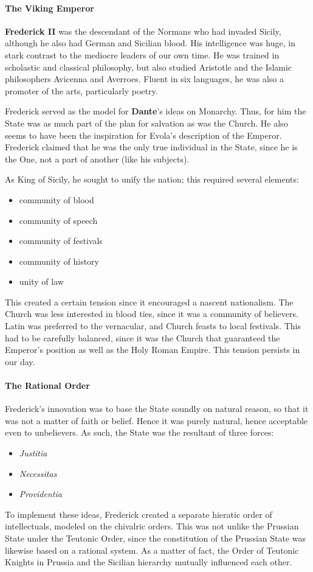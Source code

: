 \paragraph{The Viking Emperor}
\textbf{Frederick II} was the descendant of the Normans who had invaded Sicily, although he also had German and Sicilian blood. His intelligence was huge, in stark contrast to the mediocre leaders of our own time. He was trained in scholastic and classical philosophy, but also studied Aristotle and the Islamic philosophers Avicenna and Averroes. Fluent in six languages, he was also a promoter of the arts, particularly poetry.

Frederick served as the model for \textbf{Dante}'s ideas on Monarchy. Thus, for him the State was as much part of the plan for salvation as was the Church. He also seems to have been the inspiration for Evola's description of the Emperor. Frederick claimed that he was the only true individual in the State, since he is the One, not a part of another (like his subjects).

As King of Sicily, he sought to unify the nation; this required several elements:

\begin{itemize}
\item community of blood 
\item community of speech 
\item community of festivals 
\item community of history 
\item unity of law 
\end{itemize}
This created a certain tension since it encouraged a nascent nationalism. The Church was less interested in blood ties, since it was a community of believers. Latin was preferred to the vernacular, and Church feasts to local festivals. This had to be carefully balanced, since it was the Church that guaranteed the Emperor's position as well as the Holy Roman Empire. This tension persists in our day.

\paragraph{The Rational Order}
Frederick's innovation was to base the State soundly on natural reason, so that it was not a matter of faith or belief. Hence it was purely natural, hence acceptable even to unbelievers. As such, the State was the resultant of three forces:

\begin{itemize}
\item \emph{Justitia} 
\item \emph{Necessitas} 
\item \emph{Providentia} 
\end{itemize}
To implement these ideas, Frederick created a separate hieratic order of intellectuals, modeled on the chivalric orders. This was not unlike the Prussian State under the Teutonic Order, since the constitution of the Prussian State was likewise based on a rational system. As a matter of fact, the Order of Teutonic Knights in Prussia and the Sicilian hierarchy mutually influenced each other.

